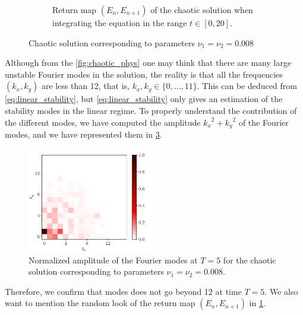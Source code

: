 \documentclass[twoside]{article}
\begin{document}
\begin{figure}[ht]
\begin{subfigure}[ht]{0.45\textwidth}
    \caption{Return map $(E_n,E_{n+1})$ of the chaotic solution when integrating the equation in the range $t\in[0,20]$.}
    \label{fig:chaotic_b}
  \end{subfigure}
  \caption{Chaotic solution corresponding to parameters $\nu_1=\nu_2=0.008$}
  \label{fig:chaotic}
\end{figure}

Although from the \cref{fig:chaotic_phys} one may think that there are many large unstable Fourier modes in the solution, the reality is that all the frequencies $(k_x,k_y)$ are less than 12, that is, $k_x,k_y\in\{0,\dots,11\}$. This can be deduced from \cref{eq:linear_stability}, but \cref{eq:linear_stability} only gives an estimation of the stability modes in the linear regime. To properly understand the contribution of the different modes, we have computed the amplitude ${k_x}^2+{k_y}^2$ of the Fourier modes, and we have represented them in \cref{fig:chaotic_modes}.

\begin{figure}[ht]
  \centering
  \includegraphics[width=0.5\textwidth]{images/slice_freq_nu1_0.008_nu2_0.008_time_5.0.pdf}
  \caption{Normalized amplitude of the Fourier modes at $T=5$ for the chaotic solution corresponding to parameters $\nu_1=\nu_2=0.008$.}
  \label{fig:chaotic_modes}
\end{figure}

Therefore, we confirm that modes does not go beyond 12 at time $T=5$. We also want to mention the random look of the return map $(E_n,E_{n+1})$ in \cref{fig:chaotic_b}.
\end{document}
